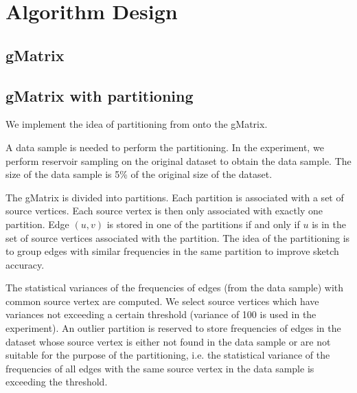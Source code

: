 
\chapter{Algorithm Design}

\ifpdf
    \graphicspath{{Chapter2/Figs/Raster/}{Chapter2/Figs/PDF/}{Chapter2/Figs/}}
\else
    \graphicspath{{Chapter2/Figs/Vector/}{Chapter2/Figs/}}
\fi

\section{gMatrix}

\section{gMatrix with partitioning}

We implement the idea of partitioning from \cite{DBLP} onto the gMatrix.

A data sample is needed to perform the partitioning. In the experiment, we perform reservoir sampling on the original dataset to obtain the data sample. The size of the data sample is 5\% of the original size of the dataset.

The gMatrix is divided into partitions. Each partition is associated with a set of source vertices. Each source vertex is then only associated with exactly one partition. Edge $(u,v)$ is stored in one of the partitions if and only if $u$ is in the set of source vertices associated with the partition. The idea of the partitioning is to group edges with similar frequencies in the same partition to improve sketch accuracy.

The statistical variances of the frequencies of edges (from the data sample) with common source vertex are computed. We select source vertices which have variances not exceeding a certain threshold (variance of 100 is used in the experiment). An outlier partition is reserved to store frequencies of edges in the dataset whose source vertex is either not found in the data sample or are not suitable for the purpose of the partitioning, i.e. the statistical variance of the frequencies of all edges with the same source vertex in the data sample is exceeding the threshold.

